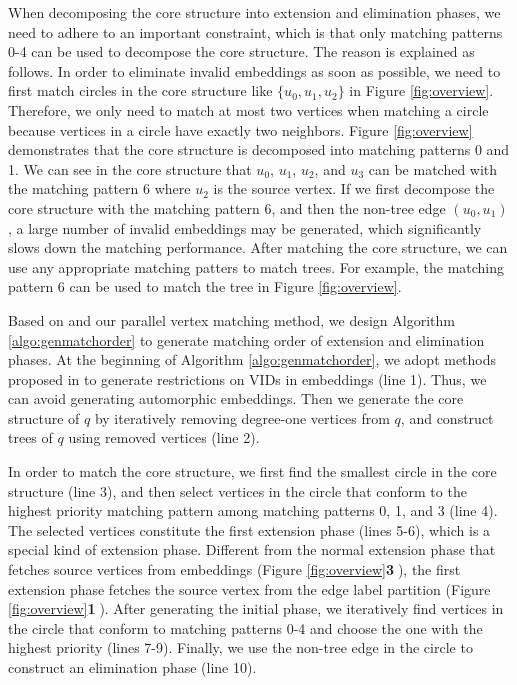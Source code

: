 When decomposing the core structure into extension and elimination phases, we need to adhere to an important constraint, which is that only matching patterns 0-4 can be used to decompose the core structure. The reason is explained as follows. In order to eliminate invalid embeddings as soon as possible, we need to first match circles in the core structure like $\{u_0, u_1, u_2\}$ in Figure \ref{fig:overview}. Therefore, we only need to match at most two vertices when matching a circle because vertices in a circle have exactly two neighbors. Figure \ref{fig:overview} demonstrates that the core structure is decomposed into matching patterns 0 and 1. We can see in the core structure that $u_0$, $u_1$, $u_2$, and $u_3$ can be matched with the matching pattern 6 where $u_2$ is the source vertex. If we first decompose the core structure with the matching pattern 6, and then the non-tree edge $(u_0, u_1)$, a large number of invalid embeddings may be generated, which significantly slows down the matching performance. After matching the core structure, we can use any appropriate matching patters to match trees. For example, the matching pattern 6 can be used to match the tree in Figure \ref{fig:overview}.


Based on \cite{bi2016efficient} and our parallel vertex matching method, we design Algorithm \ref{algo:genmatchorder} to generate matching order of extension and elimination phases. At the beginning of Algorithm \ref{algo:genmatchorder}, we adopt methods proposed in \cite{shi2020graphpi,mawhirter2019graphzero} to generate restrictions on VIDs in embeddings (line 1). Thus, we can avoid generating automorphic embeddings. Then we generate the core structure of $q$ by iteratively removing degree-one vertices from $q$, and construct trees of $q$ using removed vertices (line 2).

In order to match the core structure, we first find the smallest circle in the core structure (line 3), and then select vertices in the circle that conform to the highest priority matching pattern among matching patterns 0, 1, and 3 (line 4). The selected vertices constitute the first extension phase (lines 5-6), which is a special kind of extension phase. Different from the normal extension phase that fetches source vertices from embeddings (Figure \ref{fig:overview}\textbf{\textcircled{3}}), the first extension phase fetches the source vertex from the edge label partition (Figure \ref{fig:overview}\textbf{\textcircled{1}}). After generating the initial phase, we iteratively find vertices in the circle that conform to matching patterns 0-4 and choose the one with the highest priority (lines 7-9). Finally, we use the non-tree edge in the circle to construct an elimination phase (line 10).


